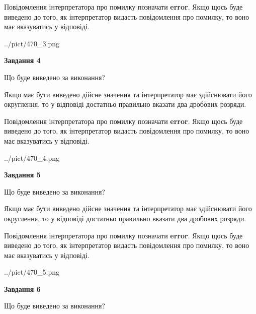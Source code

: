 \documentclass[12pt, ukrainian]{article}
\begin{document}
{\begin {Large}
Повідомлення інтерпретатора про помилку позначати \textbf{error}.
Якщо щось буде виведено до того, як інтерпретатор видасть повідомлення про помилку, 
то воно має вказуватись у відповіді. \par

\begin{center}
	{../pict/470_3.png}
\end{center}
\newpage

{\begin {center}\textbf{Завдання 4}\end {center}}\par
Що буде виведено за виконання? \par

Якщо має бути виведено дійсне значення та інтерпретатор має здійснювати його округлення, 
то у відповіді достатньо правильно вказати два дробових розряди.

Повідомлення інтерпретатора про помилку позначати \textbf{error}.
Якщо щось буде виведено до того, як інтерпретатор видасть повідомлення про помилку, 
то воно має вказуватись у відповіді. \par

\begin{center}
	{../pict/470_4.png}
\end{center}
\newpage

{\begin {center}\textbf{Завдання 5}\end {center}}\par
Що буде виведено за виконання? \par

Якщо має бути виведено дійсне значення та інтерпретатор має здійснювати його округлення, 
то у відповіді достатньо правильно вказати два дробових розряди.

Повідомлення інтерпретатора про помилку позначати \textbf{error}.
Якщо щось буде виведено до того, як інтерпретатор видасть повідомлення про помилку, 
то воно має вказуватись у відповіді. \par

\begin{center}
	{../pict/470_5.png}
\end{center}
\newpage

{\begin {center}\textbf{Завдання 6}\end {center}}\par
Що буде виведено за виконання? \par


\end{Large}}
\end{document}
